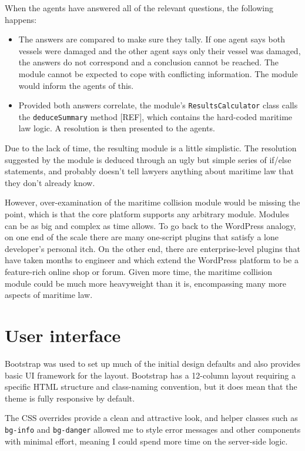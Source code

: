 When the agents have answered all of the relevant questions, the following happens:

\begin{itemize}
    \item The answers are compared to make sure they tally. If one agent says both vessels were damaged and the other agent says only their vessel was damaged, the answers do not correspond and a conclusion cannot be reached. The module cannot be expected to cope with conflicting information. The module would inform the agents of this.
    \item Provided both answers correlate, the module's \lstinline{ResultsCalculator} class calls the \lstinline{deduceSummary} method [REF], which contains the hard-coded maritime law logic. A resolution is then presented to the agents.
\end{itemize}

Due to the lack of time, the resulting module is a little simplistic. The resolution suggested by the module is deduced through an ugly but simple series of if/else statements, and probably doesn't tell lawyers anything about maritime law that they don't already know.

However, over-examination of the maritime collision module would be missing the point, which is that the core platform supports any arbitrary module. Modules can be as big and complex as time allows. To go back to the WordPress analogy, on one end of the scale there are many one-script plugins that satisfy a lone developer's personal itch. On the other end, there are enterprise-level plugins that have taken months to engineer and which extend the WordPress platform to be a feature-rich online shop or forum. Given more time, the maritime collision module could be much more heavyweight than it is, encompassing many more aspects of maritime law.

\section{User interface}

Bootstrap was used to set up much of the initial design defaults and also provides basic UI framework for the layout. Bootstrap has a 12-column layout requiring a specific HTML structure and class-naming convention, but it does mean that the theme is fully responsive by default.

The CSS overrides provide a clean and attractive look, and helper classes such as \lstinline{bg-info} and \lstinline{bg-danger} allowed me to style error messages and other components with minimal effort, meaning I could spend more time on the server-side logic.